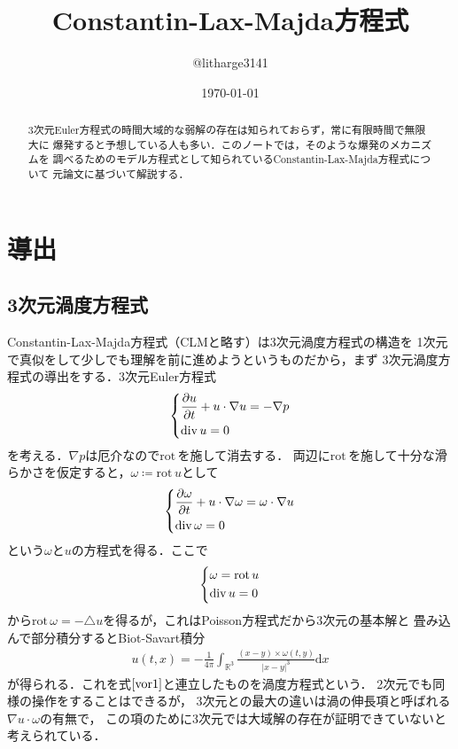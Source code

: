 \documentclass[dvipdfmx,autodetect-engine]{jsarticle}
\theoremstyle{remark}
\theoremstyle{definition}
\newcommand{\R}{\mathbb{R}}
\newcommand{\diver}{\mathrm{div} \,}
\newcommand{\rot}{\mathrm{rot} \,}
\begin{document}
\title{Constantin-Lax-Majda方程式}
\author{@litharge3141}
\date{\today}
\maketitle

\begin{abstract}
    3次元Euler方程式の時間大域的な弱解の存在は知られておらず，常に有限時間で無限大に
    爆発すると予想している人も多い．このノートでは，そのような爆発のメカニズムを
    調べるためのモデル方程式として知られているConstantin-Lax-Majda方程式について
    元論文に基づいて解説する．
\end{abstract}

\section{導出}
\subsection{3次元渦度方程式}
Constantin-Lax-Majda方程式（CLMと略す）は3次元渦度方程式の構造を
1次元で真似をして少しでも理解を前に進めようというものだから，まず
3次元渦度方程式の導出をする．3次元Euler方程式
\begin{align}
    \begin{dcases}
        \frac{\partial u}{\partial t} + u \cdot \nabla u = - \nabla p \\
        \diver u =0
    \end{dcases}
\end{align}
を考える．$\nabla p$は厄介なので$\rot$を施して消去する．
両辺に$\rot$を施して十分な滑らかさを仮定すると，$\omega \coloneqq \rot u$として
\begin{align}
    \begin{dcases}
        \frac{\partial \omega}{\partial t} + u \cdot \nabla \omega = \omega \cdot \nabla u \label{vor1} \\
        \diver\omega =0
    \end{dcases}
\end{align}
という$\omega$と$u$の方程式を得る．ここで
\begin{align}
    \begin{dcases}
        \omega = \rot u \\
        \diver u = 0
    \end{dcases}
\end{align}
から$\rot \omega = - \triangle u$を得るが，これはPoisson方程式だから3次元の基本解と
畳み込んで部分積分するとBiot-Savart積分
\begin{align}
    u(t,x) = -\frac{1}{4\pi} \int_{\R^3} \frac{(x-y)\times \omega(t,y)}{{\lvert x-y \rvert}^3} \mathrm{d}x
\end{align}
が得られる．これを式$\eqref{vor1}$と連立したものを渦度方程式という．
2次元でも同様の操作をすることはできるが，
3次元との最大の違いは渦の伸長項と呼ばれる$\nabla u \cdot \omega$の有無で，
この項のために3次元では大域解の存在が証明できていないと考えられている．
\end{document}
